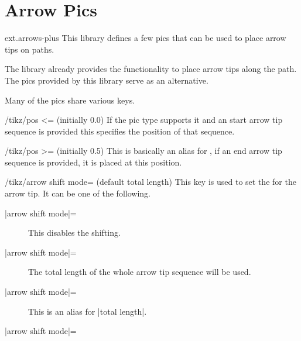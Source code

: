 %
%
%

\section{Arrow Pics}
\label{tikzlibrary:arrows}
\tikzset{external/export/.try=false}%
\begin{tikzlibrary}{ext.arrows-plus}
  This library defines a few pics that can be used to place arrow tips on paths.
\end{tikzlibrary}

\begin{multicols}{2}
The  library already provides the functionality
to place arrow tips along the path.
The pics provided by this library serve as an alternative.

Many of the pics share various keys.
\begin{key}{/tikz/pos <= (initially 0.0)}
If the pic type supports it and an start arrow tip sequence is provided
this specifies the position of that sequence.
\end{key}
\begin{key}{/tikz/pos >= (initially 0.5)}
This is basically an alias for ,
if an end arrow tip sequence is provided, it is placed at this position.
\end{key}

\begin{key}{/tikz/arrow shift mode= (default total length)}
This key is used to set the  for the arrow tip.
It can be one of the following.
\begin{description}
\item[|arrow shift mode|=]

  This disables the shifting.
\item[|arrow shift mode|=]

  The total length of the whole arrow tip sequence will be used.
\item[|arrow shift mode|=]

  This is an alias for |total length|.
\item[|arrow shift mode|=]


\end{description}
\end{key}
\end{multicols}

